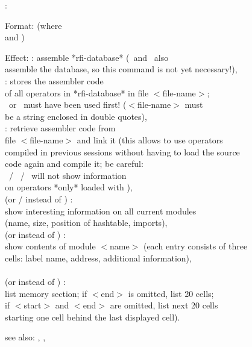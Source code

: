 \assem:

Format: 
        (where  \\ 
	 and    )

Effect:  : assemble *rfi-database* (\compile\ and \verti\ also \\
	  assemble the database, so this command is not yet necessary!),\\
         : stores the assembler code \\
          of all operators in *rfi-database* in file $<$file-name$>$;\\
          \compile\ or \verti\ must have been used first! ($<$file-name$>$ must \\
          be a string enclosed in double quotes),\\
    	 : retrieve assembler code from\\
     	  file $<$file-name$>$ and link it (this allows to use operators\\
          compiled in previous sessions without having to load the source\\
          code again and compile it; be careful:\\
     	  \listing\ / \listcode\ / \listclass\ will not show information\\
          on operators *only* loaded with ),\\
   	 (or  /  instead of ) :\\
	  show interesting information on all current modules\\
	  (name, size, position of hashtable, imports),\\
    	 (or  instead of ) :\\
	  show contents of module $<$name$>$ (each entry consists of three\\
          cells: label name, address, additional information),\\
   	\\ (or  instead of ) :\\
	  list memory section; if $<$end$>$ is omitted, list 20 cells;\\
	  if $<$start$>$ and $<$end$>$ are omitted, list next 20 cells \\
	  starting one cell behind the last displayed cell).

see also: \horizon, \verti, \compile

